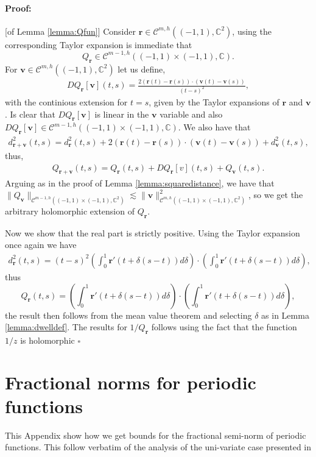 \documentclass{article}
\newenvironment{proof}{\paragraph{Proof:}}{\hfill$\square$}
\newcommand{\IC}{{\mathbb C}}
\newcommand{\cmspaceh}[4]{\mathcal{C}^{#1,#2} \left( #3, #4 \right)}
\newcommand{\bv}{\bm{v}}
\newcommand{\br}{\bm{r}}
\newcommand{\iinterv}{(-1,1)\times(-1,1)}
\begin{document}
\begin{proof}[of Lemma \ref{lemma:Qfun}]
Consider $\br \in \cmspaceh{m}{h}{(-1,1)}{\IC^2}$, using the corresponding Taylor expansion is immediate that  $$Q_{\br} \in \cmspaceh{m-1}{h}{(-1,1)\times(-1,1)}{\IC}.$$  For $\bv \in \cmspaceh{m}{h}{(-1,1)}{\IC^2}$ let us define,
\begin{align*}
DQ_{\br}[\bv](t,s) = \frac{2 (\br(t)-\br(s))\cdot (\bv(t)-\bv(s))}{(t-s)^2}, 
\end{align*}
with the continious extension for $t=s$, given by the Taylor expansions of $\br$ and $\bv$. Is clear that $DQ_{\br}[\bv]$ is linear in the $\bv$ variable and also $DQ_{\br}[\bv] \in \cmspaceh{m-1}{h}{(-1,1)\times(-1,1)}{\IC}$. We also have that 
\begin{align*}
d_{\br +\bv}^2(t,s) = d^2_{\br}(t,s) + 2 (\br(t) -\br(s))\cdot (\bv(t)-\bv(s)) + d_{\bv}^2(t,s),
\end{align*}
thus, 
\begin{align*}
Q_{\br +\bv}(t,s) = Q_{\br}(t,s) + DQ_{\br}[v](t,s) + Q_{\bv}(t,s).
\end{align*}
Arguing as in the proof of Lemma \ref{lemma:squaredistance}, 
we have that $\| Q_{\bv}\|_{\cmspaceh{m-1}{h}{\iinterv}{\IC^2}} \lesssim \| \bv\|_{\cmspaceh{m}{h}{\iinterv}{\IC^2}}^2$, so we get the arbitrary holomorphic extension of $Q_{\br}$.

Now we show that the real part is strictly positive. Using the Taylor expansion once again we have 
\begin{align*}
d_{\br}^2(t,s) = (t-s)^2 \left(\int_{0}^1 \br'(t+\delta(s-t))d\delta \right) \cdot \left(\int_{0}^1 \br'(t+\delta(s-t))d\delta \right),
\end{align*}
thus 
$$
Q_{\br}(t,s) = \left(\int_{0}^1 \br'(t+\delta(s-t))d\delta \right) \cdot \left(\int_{0}^1 \br'(t+\delta(s-t))d\delta \right),
$$
the result then follows from the mean value theorem and selecting $\delta$ as in Lemma \ref{lemma:dwelldef}. The results for $1/Q_{\br}$  follows using the fact that the function $1/z$ is holomorphic 
\end{proof}

\section{Fractional norms for periodic functions}
\label{appendix:fracbivariate}
This Appendix show how we get bounds for the fractional semi-norm of periodic functions. This follow verbatim of the analysis of the uni-variate case presented in \cite[Theorem 8.6]{kress2013linear} 
\end{document}
